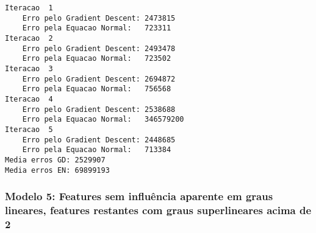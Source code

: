 \documentclass[11pt]{article}
\begin{document}
    \begin{Verbatim}[commandchars=\\\{\}]
Iteracao  1
	Erro pelo Gradient Descent: 2473815
	Erro pela Equacao Normal:   723311
Iteracao  2
	Erro pelo Gradient Descent: 2493478
	Erro pela Equacao Normal:   723502
Iteracao  3
	Erro pelo Gradient Descent: 2694872
	Erro pela Equacao Normal:   756568
Iteracao  4
	Erro pelo Gradient Descent: 2538688
	Erro pela Equacao Normal:   346579200
Iteracao  5
	Erro pelo Gradient Descent: 2448685
	Erro pela Equacao Normal:   713384
Media erros GD: 2529907
Media erros EN: 69899193

    \end{Verbatim}

    \subsubsection{Modelo 5: Features sem influência aparente em graus
lineares, features restantes com graus superlineares acima de
2}\label{modelo-5-features-sem-influuxeancia-aparente-em-graus-lineares-features-restantes-com-graus-superlineares-acima-de-2}
\end{document}

